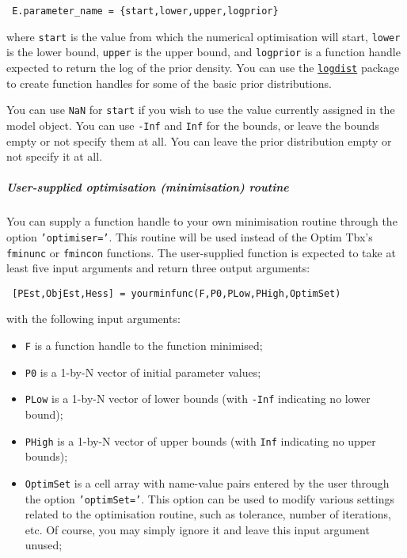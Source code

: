  \begin{verbatim}
 E.parameter_name = {start,lower,upper,logprior}
 \end{verbatim}
 
 where \texttt{start} is the value from which the numerical optimisation
 will start, \texttt{lower} is the lower bound, \texttt{upper} is the
 upper bound, and \texttt{logprior} is a function handle expected to
 return the log of the prior density. You can use the
 \href{logdist/Contents}{\texttt{logdist}} package to create function
 handles for some of the basic prior distributions.
 
 You can use \texttt{NaN} for \texttt{start} if you wish to use the value
 currently assigned in the model object. You can use \texttt{-Inf} and
 \texttt{Inf} for the bounds, or leave the bounds empty or not specify
 them at all. You can leave the prior distribution empty or not specify
 it at all.
 
 \subparagraph{User-supplied optimisation (minimisation) routine}
 
 You can supply a function handle to your own minimisation routine
 through the option \texttt{'optimiser='}. This routine will be used
 instead of the Optim Tbx's \texttt{fminunc} or \texttt{fmincon}
 functions. The user-supplied function is expected to take at least five
 input arguments and return three output arguments:
 
 \begin{verbatim}
 [PEst,ObjEst,Hess] = yourminfunc(F,P0,PLow,PHigh,OptimSet)
 \end{verbatim}
 
 with the following input arguments:
 
 \begin{itemize}
 \item
   \texttt{F} is a function handle to the function minimised;
 \item
   \texttt{P0} is a 1-by-N vector of initial parameter values;
 \item
   \texttt{PLow} is a 1-by-N vector of lower bounds (with \texttt{-Inf}
   indicating no lower bound);
 \item
   \texttt{PHigh} is a 1-by-N vector of upper bounds (with \texttt{Inf}
   indicating no upper bounds);
 \item
   \texttt{OptimSet} is a cell array with name-value pairs entered by the
   user through the option \texttt{'optimSet='}. This option can be used
   to modify various settings related to the optimisation routine, such
   as tolerance, number of iterations, etc. Of course, you may simply
   ignore it and leave this input argument unused;
 \end{itemize}
 
